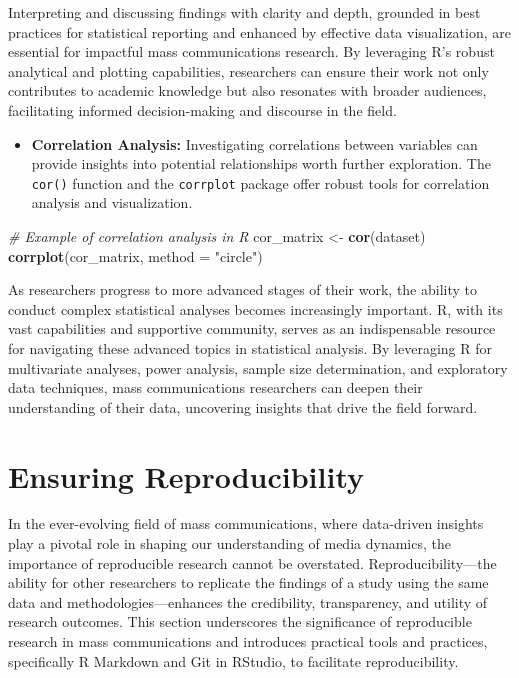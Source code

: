 \documentclass[
]{book}
\newenvironment{Shaded}{\begin{snugshade}}{\end{snugshade}}
\newcommand{\AttributeTok}[1]{\textcolor[rgb]{0.13,0.29,0.53}{#1}}
\newcommand{\CommentTok}[1]{\textcolor[rgb]{0.56,0.35,0.01}{\textit{#1}}}
\newcommand{\FunctionTok}[1]{\textcolor[rgb]{0.13,0.29,0.53}{\textbf{#1}}}
\newcommand{\NormalTok}[1]{#1}
\newcommand{\OtherTok}[1]{\textcolor[rgb]{0.56,0.35,0.01}{#1}}
\newcommand{\StringTok}[1]{\textcolor[rgb]{0.31,0.60,0.02}{#1}}
\providecommand{\tightlist}{%
  \setlength{\itemsep}{0pt}\setlength{\parskip}{0pt}}
\begin{document}
Interpreting and discussing findings with clarity and depth, grounded in best practices for statistical reporting and enhanced by effective data visualization, are essential for impactful mass communications research. By leveraging R's robust analytical and plotting capabilities, researchers can ensure their work not only contributes to academic knowledge but also resonates with broader audiences, facilitating informed decision-making and discourse in the field.

\begin{itemize}
\tightlist
\item
  \textbf{Correlation Analysis:} Investigating correlations between variables can provide insights into potential relationships worth further exploration. The \texttt{cor()} function and the \texttt{corrplot} package offer robust tools for correlation analysis and visualization.
\end{itemize}

\begin{Shaded}
\begin{Highlighting}[]
\CommentTok{\# Example of correlation analysis in R}
\NormalTok{cor\_matrix }\OtherTok{\textless{}{-}} \FunctionTok{cor}\NormalTok{(dataset)}
\FunctionTok{corrplot}\NormalTok{(cor\_matrix, }\AttributeTok{method =} \StringTok{"circle"}\NormalTok{)}
\end{Highlighting}
\end{Shaded}

As researchers progress to more advanced stages of their work, the ability to conduct complex statistical analyses becomes increasingly important. R, with its vast capabilities and supportive community, serves as an indispensable resource for navigating these advanced topics in statistical analysis. By leveraging R for multivariate analyses, power analysis, sample size determination, and exploratory data techniques, mass communications researchers can deepen their understanding of their data, uncovering insights that drive the field forward.

\section{Ensuring Reproducibility}\label{ensuring-reproducibility}

In the ever-evolving field of mass communications, where data-driven insights play a pivotal role in shaping our understanding of media dynamics, the importance of reproducible research cannot be overstated. Reproducibility---the ability for other researchers to replicate the findings of a study using the same data and methodologies---enhances the credibility, transparency, and utility of research outcomes. This section underscores the significance of reproducible research in mass communications and introduces practical tools and practices, specifically R Markdown and Git in RStudio, to facilitate reproducibility.
\end{document}
